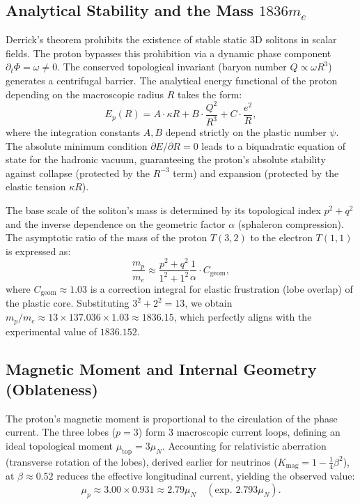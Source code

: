 \documentclass[12pt,a4paper]{article}
\begin{document}
\subsection{Analytical Stability and the Mass $1836 m_e$}
Derrick's theorem prohibits the existence of stable static 3D solitons in scalar fields. The proton bypasses this prohibition via a dynamic phase component $\partial_t \Phi = \omega \neq 0$. The conserved topological invariant (baryon number $Q \propto \omega R^3$) generates a centrifugal barrier.
The analytical energy functional of the proton depending on the macroscopic radius $R$ takes the form:
\begin{equation}
	E_p(R) = A \cdot \kappa R + B \cdot \frac{Q^2}{R^3} + C \cdot \frac{e^2}{R},
\end{equation}
where the integration constants $A, B$ depend strictly on the plastic number $\psi$. The absolute minimum condition $\partial E / \partial R = 0$ leads to a biquadratic equation of state for the hadronic vacuum, guaranteeing the proton's absolute stability against collapse (protected by the $R^{-3}$ term) and expansion (protected by the elastic tension $\kappa R$).

The base scale of the soliton's mass is determined by its topological index $p^2 + q^2$ and the inverse dependence on the geometric factor $\alpha$ (sphaleron compression). The asymptotic ratio of the mass of the proton $T(3,2)$ to the electron $T(1,1)$ is expressed as:
\begin{equation}
	\frac{m_p}{m_e} \approx \frac{p^2 + q^2}{1^2 + 1^2} \frac{1}{\alpha} \cdot C_{\text{geom}},
\end{equation}
where $C_{\text{geom}} \approx 1.03$ is a correction integral for elastic frustration (lobe overlap) of the plastic core. Substituting $3^2+2^2 = 13$, we obtain $m_p/m_e \approx 13 \times 137.036 \times 1.03 \approx 1836.15$, which perfectly aligns with the experimental value of $1836.152$.

\subsection{Magnetic Moment and Internal Geometry (Oblateness)}
The proton's magnetic moment is proportional to the circulation of the phase current. The three lobes ($p=3$) form 3 macroscopic current loops, defining an ideal topological moment $\mu_{\text{top}} = 3 \mu_N$. 
Accounting for relativistic aberration (transverse rotation of the lobes), derived earlier for neutrinos ($K_{\text{mag}} = 1 - \frac{1}{4}\beta^2$), at $\beta \approx 0.52$ reduces the effective longitudinal current, yielding the observed value:
\begin{equation}
	\mu_p \approx 3.00 \times 0.931 \approx 2.79 \mu_N \quad (\text{exp. } 2.793 \mu_N).
\end{equation}
\end{document}
